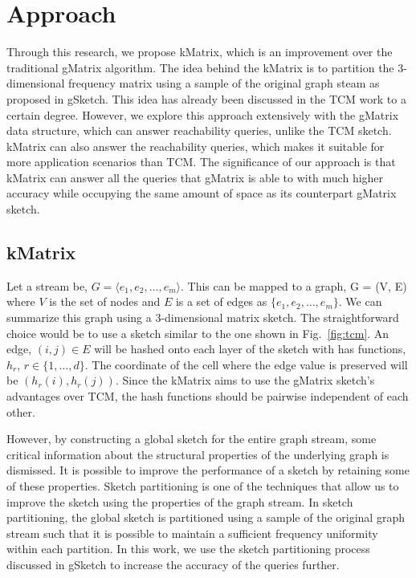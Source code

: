 \section{Approach}

Through this research, we propose kMatrix, which is an improvement over the traditional gMatrix algorithm. The idea behind the kMatrix is to partition the 3-dimensional frequency matrix using a sample of the original graph steam as proposed in gSketch\cite{zhao_gsketch:_2011}. This idea has already been discussed in the TCM\cite{tang_graph_2016} work to a certain degree. However, we explore this approach extensively with the gMatrix data structure, which can answer reachability queries, unlike the TCM sketch. kMatrix can also answer the reachability queries, which makes it suitable for more application scenarios than TCM. The significance of our approach is that kMatrix can answer all the queries that gMatrix is able to with much higher accuracy while occupying the same amount of space as its counterpart gMatrix sketch. 

\subsection{kMatrix}

Let a stream be, \(G = \langle e_{1}, e_{2}, \ldots, e_{m} \rangle\). This can be mapped to a graph, G = (V, E) where \(V\) is the set of nodes and \(E\) is a set of edges as \(\{e_{1}, e_{2}, \ldots, e_{m}\}\). We can summarize this graph using a 3-dimensional matrix sketch\cite{khan_query-friendly_2016}. The straightforward choice would be to use a sketch similar to the one shown in Fig.~\ref{fig:tcm}. An edge, \((i, j) \in E\) will be hashed onto each layer of the sketch with has functions, \(h_{r}\), \(r \in \{1, \ldots, d\}\). The coordinate of the cell where the edge value is preserved will be \((h_{r}(i), h_{r}(j))\). Since the kMatrix aims to use the gMatrix sketch’s advantages over TCM, the hash functions should be pairwise independent of each other. 

However, by constructing a global sketch for the entire graph stream, some critical information about the structural properties of the underlying graph is dismissed. It is possible to improve the performance of a sketch by retaining some of these properties. Sketch partitioning\cite{zhao_gsketch:_2011} is one of the techniques that allow us to improve the sketch using the properties of the graph stream. In sketch partitioning, the global sketch is partitioned using a sample of the original graph stream such that it is possible to maintain a sufficient frequency uniformity within each partition. In this work, we use the sketch partitioning process discussed in gSketch to increase the accuracy of the queries further.

